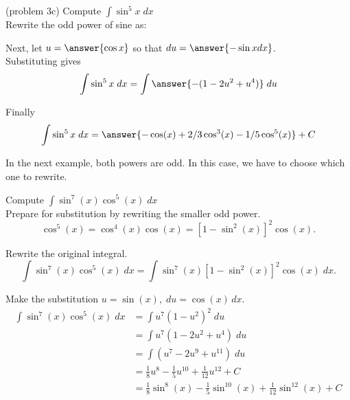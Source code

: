 \documentclass[handout]{ximera}
\begin{document}
\begin{problem}{\color{gray}(problem 3c)} 
Compute $\displaystyle{\int \sin^5 x \; dx}$\\

Rewrite the odd power of sine as:

\begin{multipleChoice}
\end{multipleChoice}

Next, let $u = \answer{\cos x}$ so that $du = \answer{-\sin x dx}$.\\

Substituting gives
\[
\int \sin^5 x \; dx= \int \answer{-(1-2u^2 + u^4)} \; du
\]

Finally
\[
\int \sin^5 x \; dx= \answer{- \cos(x) + 2/3 \cos^3(x) - 1/5 \cos^5(x)} + C
\]

\end{problem}

In the next example, both powers are odd.  In this case, we have to choose which one to rewrite.



\begin{example}[example 4]
Compute $\displaystyle{\int \sin^7(x)\cos^5(x) \; dx}$\\

Prepare for substitution by rewriting the smaller odd power.
\[
\cos^5(x) = \cos^4(x) \cos(x) = \left[1-\sin^2(x)\right]^2 \cos(x).
\]

Rewrite the original integral.
\[
\int \sin^7(x)\cos^5(x) \; dx = \int \sin^7(x)\left[1 - \sin^2(x)\right]^2 \cos(x) \; dx.
\]

Make the substitution $u = \sin(x), \; du = \cos(x) \, dx$.
\begin{align*}
\int \sin^7(x)\cos^5(x) \; dx  &= \int u^7 (1-u^2)^2 \; du\\
   &= \int u^7(1 - 2u^2 + u^4) \; du\\
   &= \int (u^7 - 2u^9 + u^{11}) \; du\\
  &= \tfrac18 u^8 - \tfrac15 u^{10} + \tfrac{1}{12}u^{12}+ C \\
  &= \tfrac18 \sin^8(x) - \tfrac15 \sin^{10}(x) + \tfrac{1}{12} \sin^{12}(x)+ C
\end{align*}

\end{example}
\end{document}
